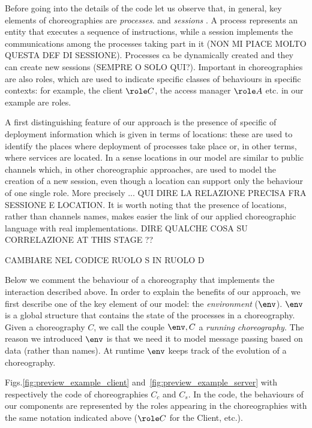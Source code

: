 Before going into the details of the code let us observe that, in general, key elements of choreographies are \emph{processes}.
and \emph{sessions} . A process represents an entity that executes a sequence of instructions, 
while a session implements the communications among the processes taking part in it (NON MI PIACE MOLTO 
QUESTA DEF DI SESSIONE).  Processes ca be dynamically created and they can create new sessions 
(SEMPRE O SOLO QUI?). 
Important in choreographies are also roles, which are used to indicate specific classes of behaviours in specific contexts: for example, the client $\role C$, the access manager $\role A$ etc. in our example are roles.  

A first distinguishing feature of our approach is the presence of specific of
deployment information which is given in terms of locations: these are used to
identify the places where deployment of processes take place or, in other
terms, where services are located. In a sense locations in our model are
similar to public channels which, in other choreographic approaches, are used
to model the creation of a new session, even though a location can support only
the behaviour of one single role. More precisely ... QUI DIRE LA RELAZIONE
PRECISA FRA SESSIONE E LOCATION. It is worth noting that the presence of
locations, rather than channels names, makes easier the link of our applied
choreographic language with real implementations. DIRE QUALCHE COSA SU
CORRELAZIONE AT THIS STAGE ??





CAMBIARE NEL CODICE RUOLO S IN RUOLO D

Below we comment the behaviour of a choreography that implements the
interaction described above. In order to explain the benefits of our approach,
we first describe one of the key element of our model: the \emph {environment}
($\env$). $\env$ is a global structure that contains the state of the processes
in a choreography. Given a choreography $C$, we call the couple $\env,C$ a
\emph {running choreography}. The reason we introduced $\env$ is that we need
it to model message passing based on data (rather than names). At runtime
$\env$ keeps track of the evolution of a choreography.

Figs.\ref{fig:preview_example_client} and~\ref{fig:preview_example_server} with
respectively the code of choreographies $C_c$ and $C_s$. In the code, the
behaviours of our components are represented by the roles appearing in the
choreographies with the same notation indicated above ($\role C$ for the
Client, etc.).

